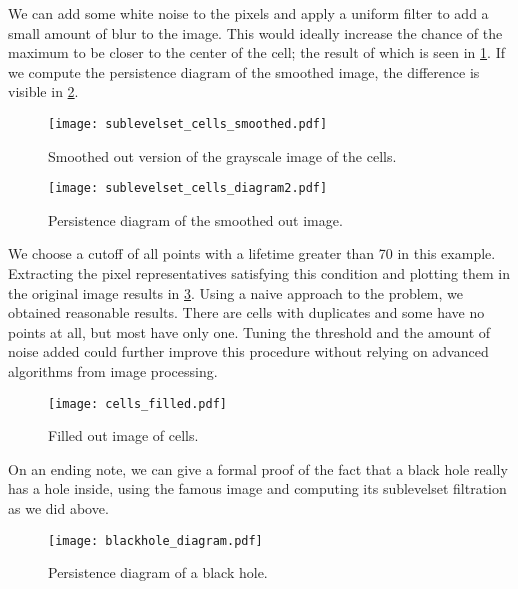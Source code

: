 We can add some white noise to the pixels and apply a uniform filter to add a small amount of blur to the image. This would ideally increase the chance of the maximum to be closer to the center of the cell; the result of which is seen in \ref{fig:cells_smoothed}. If we compute the persistence diagram of the smoothed image, the difference is visible in \ref{fig:cells_diagram2}.

\begin{figure}[h!]
  \centering
  \texttt{[image: sublevelset\_cells\_smoothed.pdf]}
  \caption{Smoothed out version of the grayscale image of the cells.}
  \label{fig:cells_smoothed}
\end{figure}

\begin{figure}[h!]
  \centering
  \texttt{[image: sublevelset\_cells\_diagram2.pdf]}
  \caption{Persistence diagram of the smoothed out image.}
  \label{fig:cells_diagram2}
\end{figure}

We choose a cutoff of all points with a lifetime greater than 70 in this example. Extracting the pixel representatives satisfying this condition and plotting them in the original image results in \ref{fig:cells_filled}. Using a naive approach to the problem, we obtained reasonable results. There are cells with duplicates and some have no points at all, but most have only one. Tuning the threshold and the amount of noise added could further improve this procedure without relying on advanced algorithms from image processing.

\begin{figure}[h!]
  \centering
  \texttt{[image: cells\_filled.pdf]}
  \caption{Filled out image of cells.}
  \label{fig:cells_filled}
\end{figure}

On an ending note, we can give a formal proof of the fact that a black hole really has a hole inside, using the famous image and computing its sublevelset filtration as we did above.

\begin{figure}[h!]
  \centering
  \texttt{[image: blackhole\_diagram.pdf]}
  \caption{Persistence diagram of a black hole.}
  \label{fig:black_hole}
\end{figure}
